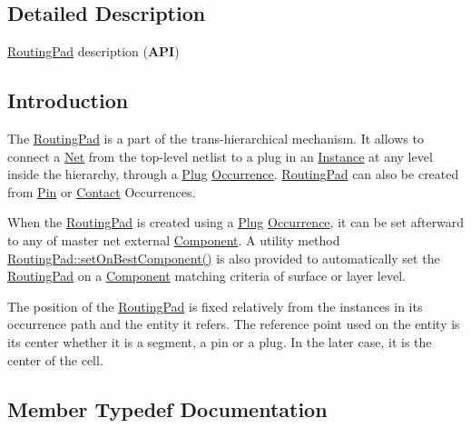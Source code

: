 \subsection{Detailed Description}
\mbox{\hyperlink{classHurricane_1_1RoutingPad}{Routing\+Pad}} description ({\bfseries A\+PI}) 

\hypertarget{classHurricane_1_1RoutingPad_secRoutingPadIntro}{}\subsection{Introduction}\label{classHurricane_1_1RoutingPad_secRoutingPadIntro}
The \mbox{\hyperlink{classHurricane_1_1RoutingPad}{Routing\+Pad}} is a part of the trans-\/hierarchical mechanism. It allows to connect a \mbox{\hyperlink{classHurricane_1_1Net}{Net}} from the top-\/level netlist to a plug in an \mbox{\hyperlink{classHurricane_1_1Instance}{Instance}} at any level inside the hierarchy, through a \mbox{\hyperlink{classHurricane_1_1Plug}{Plug}} \mbox{\hyperlink{classHurricane_1_1Occurrence}{Occurrence}}. \mbox{\hyperlink{classHurricane_1_1RoutingPad}{Routing\+Pad}} can also be created from \mbox{\hyperlink{classHurricane_1_1Pin}{Pin}} or \mbox{\hyperlink{classHurricane_1_1Contact}{Contact}} Occurrences.

When the \mbox{\hyperlink{classHurricane_1_1RoutingPad}{Routing\+Pad}} is created using a \mbox{\hyperlink{classHurricane_1_1Plug}{Plug}} \mbox{\hyperlink{classHurricane_1_1Occurrence}{Occurrence}}, it can be set afterward to any of master net external \mbox{\hyperlink{classHurricane_1_1Component}{Component}}. A utility method \mbox{\hyperlink{classHurricane_1_1RoutingPad_a410992ef75c40f9a898c36f39a7d1a1a}{Routing\+Pad\+::set\+On\+Best\+Component()}} is also provided to automatically set the \mbox{\hyperlink{classHurricane_1_1RoutingPad}{Routing\+Pad}} on a \mbox{\hyperlink{classHurricane_1_1Component}{Component}} matching criteria of surface or layer level.

The position of the \mbox{\hyperlink{classHurricane_1_1RoutingPad}{Routing\+Pad}} is fixed relatively from the instances in it\textquotesingle{}s occurrence path and the entity it refers. The reference point used on the entity is it\textquotesingle{}s center whether it is a segment, a pin or a plug. In the later case, it is the center of the cell. 

\subsection{Member Typedef Documentation}
\mbox{\label{classHurricane_1_1RoutingPad_a53bed3713fe846a351621d2022bc6b68}} 
